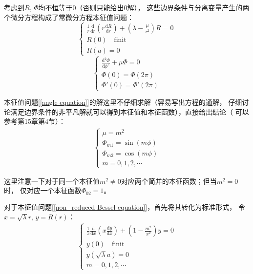 \documentclass[a4paper]{ctexart}
\def\d{\mathrm{d}}
\newcommand{\mr}[1]{\mathrm{#1}}
\newcommand{\dv}[2]{\frac{\d{#1}}{\d{#2}}}
\begin{document}
	\par 考虑到$R,\, \Phi$均不恒等于0（否则只能给出0解），
	这些边界条件与分离变量产生的两个微分方程构成了常微分方程本征值问题：
	\begin{equation}
		\left\{ 
			\begin{array}{lr}
				\displaystyle\frac{1}{r}\dv{}{r}\left(r\dv{R}{r} \right) + \left(\lambda - \frac{\mu}{r^2}\right)R = 0\\
				R(0)\quad\mr{finit}\\
				R(a) = 0
			\end{array}
		\right.
		\label{non_reduced Bessel equation}
	\end{equation}
	\begin{equation}
		\left\{ 
			\begin{array}{lr}
				\displaystyle\dv{^2\Phi}{\phi^2} + \mu \Phi = 0\\
				\Phi(0) = \Phi(2\pi)\\
				\Phi'(0) = \Phi'(2\pi)
			\end{array}
		\right.
		\label{angle equation}
	\end{equation}
	\par 本征值问题[\ref{angle equation}]的解这里不仔细求解（容易写出方程的通解，
	仔细讨论满足边界条件的非平凡解就可以得到本征值和本征函数），直接给出结论（
	可以参考\cite{mathematicalmethod}第15章第4节）：
	\begin{align}
		\left\{ 
			\begin{array}{lr}
				\mu = m^{2}\\
				\Phi_{m1} = \sin(m\phi)\\
				\Phi_{m2} = \cos(m\phi)\\
				m = 0,1,2,\cdots 
			\end{array}
		\right.
	\end{align}
	\par 这里注意一下对于同一个本征值$m^2 \neq 0$对应两个简并的本征函数；但当$m^2=0$时，
	仅对应一个本征函数$\Phi_{02} = 1$。
	\par 对于本征值问题[\ref{non_reduced Bessel equation}]，首先将其转化为标准形式，
	令$x = \sqrt{\lambda}r,\, y = R(r)$：
	\begin{align}
		\left\{ 
			\begin{array}{lr}
				\displaystyle\frac{1}{x}\dv{}{x}\left(x\dv{y}{x} \right) + \left(1 - \frac{m^2}{x^2}\right)y = 0\\
				y(0)\quad\mr{finit}\\
				y(\sqrt{\lambda}a) = 0\\
				m = 0, 1, 2, \cdots
			\end{array}
		\right.
	\end{align}
\end{document}
